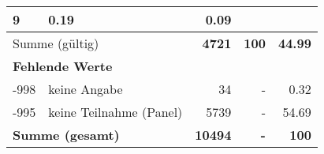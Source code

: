 \begin{longtable}{lXrrr}
       \num{9} &
       \num[round-mode=places,round-precision=2]{0.19} &
         \num[round-mode=places,round-precision=2]{0.09} \\
     \midrule
     \multicolumn{2}{l}{Summe (gültig)} &
       \textbf{\num{4721}} &
     \textbf{\num{100}} &
       \textbf{\num[round-mode=places,round-precision=2]{44.99}} \\
     \multicolumn{5}{l}{\textbf{Fehlende Werte}}\\
       -998 &
       keine Angabe &
         \num{34} &
        - &
         \num[round-mode=places,round-precision=2]{0.32} \\
       -995 &
       keine Teilnahme (Panel) &
         \num{5739} &
        - &
         \num[round-mode=places,round-precision=2]{54.69} \\
     \midrule
     \multicolumn{2}{l}{\textbf{Summe (gesamt)}} &
          \textbf{\num{10494}} &
        \textbf{-} &
        \textbf{\num{100}} \\
     \bottomrule
     \end{longtable}
     
